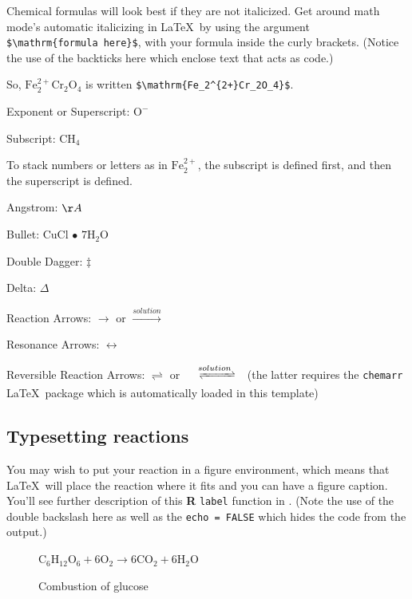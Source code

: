 \documentclass[12pt,twoside]{reedthesis}
\begin{document}
  Chemical formulas will look best if they are not italicized. Get around
  math mode's automatic italicizing in \LaTeX~by using the argument
  \texttt{\$\textbackslash{}mathrm\{formula\ here\}\$}, with your formula
  inside the curly brackets. (Notice the use of the backticks here which
  enclose text that acts as code.)
  
  So, \(\mathrm{Fe_2^{2+}Cr_2O_4}\) is written
  \texttt{\$\textbackslash{}mathrm\{Fe\_2\^{}\{2+\}Cr\_2O\_4\}\$}.
  
  \noindent Exponent or Superscript: \(\mathrm{O^-}\)
  
  \noindent Subscript: \(\mathrm{CH_4}\)
  
  To stack numbers or letters as in \(\mathrm{Fe_2^{2+}}\), the subscript
  is defined first, and then the superscript is defined.
  
  \noindent Angstrom: \({\AA}\)
  
  \noindent Bullet: CuCl \(\bullet\) \(\mathrm{7H_{2}O}\)
  
  \noindent Double Dagger: \(\ddag\)
  
  \noindent Delta: \(\Delta\)
  
  \noindent Reaction Arrows: \(\longrightarrow\) or
  \(\xrightarrow{solution}\)
  
  \noindent Resonance Arrows: \(\leftrightarrow\)
  
  \noindent Reversible Reaction Arrows: \(\rightleftharpoons\) or
  \(\xrightleftharpoons[ ]{solution}\) (the latter requires the
  \texttt{chemarr} \LaTeX~package which is automatically loaded in this
  template)
  
  \subsection{Typesetting reactions}\label{typesetting-reactions}
  
  You may wish to put your reaction in a figure environment, which means
  that \LaTeX~will place the reaction where it fits and you can have a
  figure caption. You'll see further description of this \textbf{R}
  \texttt{label} function in \protect\hyperlink{refux5flabels}{}. (Note
  the use of the double backslash here as well as the
  \texttt{echo\ =\ FALSE} which hides the code from the output.)
  
  \begin{figure}[h!tbp]
  \begin{center}
  $\mathrm{C_6H_{12}O_6  + 6O_2} \longrightarrow \mathrm{6CO_2 + 6H_2O}$
  \caption{Combustion of glucose}
  \label{fig:comb-gluc}
  \end{center}
  \end{figure}
  
\end{document}
